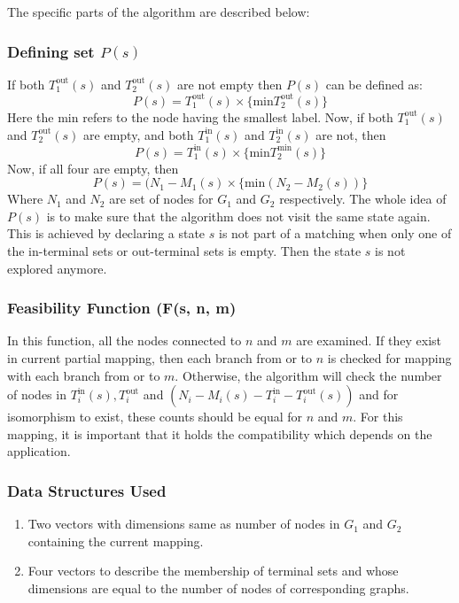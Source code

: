 \documentclass[11pt]{article}
\begin{document}
The specific parts of the algorithm are described below:
\subsubsection{Defining set $P(s)$}
If both $T^{\text{out}}_1(s)$ and $T^{\text{out}}_2(s)$ are not empty then $P(s)$ can be defined as:
\[ P(s) = T^{\text{out}}_1(s) \times \{ \text{min} T^{\text{out}}_2(s) \} \]
Here the min refers to the node having the smallest label. Now, if both $T^{\text{out}}_1(s)$ and $T^{\text{out}}_2(s)$ are empty, and both $T^{\text{in}}_1(s)$ and $T^{\text{in}}_2(s)$ are not, then
\[ P(s) = T^{\text{in}}_1(s) \times \{ \text{min} T^{\text{min}}_2(s) \} \]
Now, if all four are empty, then
\[ P(s) = (N_1 - M_1(s) \times \{ \text{min} (N_2 - M_2(s)) \} \]
Where $N_1$ and $N_2$ are set of nodes for $G_1$ and $G_2$ respectively. The whole idea of $P(s)$ is to make sure that the algorithm does not visit the same state again. This is achieved by declaring a state $s$ is not part of a matching when only one of the in-terminal sets or out-terminal sets is empty. Then the state $s$ is not explored anymore.
\subsubsection{Feasibility Function (F(s, n, m)}
In this function, all the nodes connected to $n$ and $m$ are examined. If they exist in current partial mapping, then each branch from or to $n$ is checked for mapping with each branch from or to $m$. Otherwise, the algorithm will check the number of nodes in $T^{\text{in}}_i(s), T^{\text{out}}_i$ and $(N_i - M_i(s) - T_i^{\text{in}} - T_i^{\text{out}}(s))$ and for isomorphism to exist, these counts should be equal for $n$ and $m$. For this mapping, it is important that it holds the compatibility which depends on the application.

\subsubsection{Data Structures Used}
\begin{enumerate}
    \item Two vectors with dimensions same as number of nodes in $G_1$ and $G_2$ containing the current mapping. 
    \item Four vectors to describe the membership of terminal sets and whose dimensions are equal to the number of nodes of corresponding graphs.
\end{enumerate}
\end{document}
